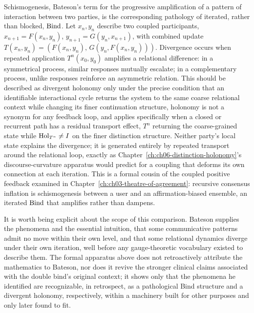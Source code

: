 Schismogenesis, Bateson's term for the progressive amplification of a pattern of interaction between two parties, is the corresponding pathology of iterated, rather than blocked, $\mathrm{Bind}$. Let $x_n, y_n$ describe two coupled participants, $x_{n+1} = F(x_n,y_n)$, $y_{n+1} = G(y_n, x_{n+1})$, with combined update $T(x_n,y_n) = (F(x_n,y_n),\, G(y_n, F(x_n,y_n)))$. Divergence occurs when repeated application $T^n(x_0,y_0)$ amplifies a relational difference: in a symmetrical process, similar responses mutually escalate; in a complementary process, unlike responses reinforce an asymmetric relation. This should be described as divergent holonomy only under the precise condition that an identifiable interactional cycle returns the system to the same coarse relational context while changing its finer continuation structure, holonomy is not a synonym for any feedback loop, and applies specifically when a closed or recurrent path has a residual transport effect, $T^n$ returning the coarse-grained state while $\operatorname{Hol}_{T^n} \neq I$ on the finer distinction structure. Neither party's local state explains the divergence; it is generated entirely by repeated transport around the relational loop, exactly as Chapter~\ref{ch:ch06-distinction-holonomy}'s discourse-curvature apparatus would predict for a coupling that deforms its own connection at each iteration. This is a formal cousin of the coupled positive feedback examined in Chapter~\ref{ch:ch03-theatre-of-agreement}: recursive consensus inflation is schismogenesis between a user and an affirmation-biased ensemble, an iterated $\mathrm{Bind}$ that amplifies rather than dampens.

It is worth being explicit about the scope of this comparison. Bateson supplies the phenomena and the essential intuition, that some communicative patterns admit no move within their own level, and that some relational dynamics diverge under their own iteration, well before any gauge-theoretic vocabulary existed to describe them. The formal apparatus above does not retroactively attribute the mathematics to Bateson, nor does it revive the stronger clinical claims associated with the double bind's original context; it shows only that the phenomena he identified are recognizable, in retrospect, as a pathological Bind structure and a divergent holonomy, respectively, within a machinery built for other purposes and only later found to fit.

